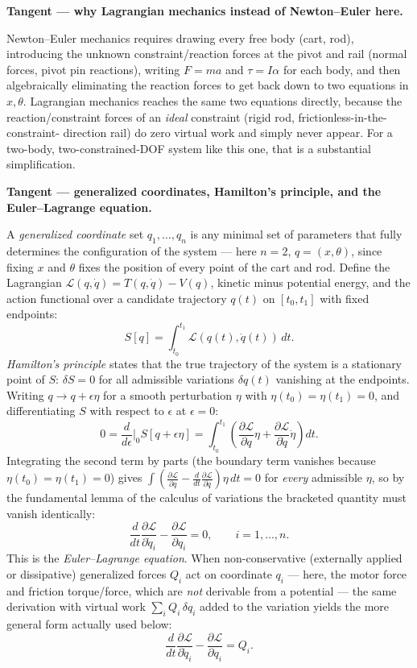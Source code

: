 \documentclass[11pt]{article}
\newenvironment{tangent}[1]{%
  \par\smallskip\noindent\hrulefill\par
  \noindent\textbf{Tangent — #1.}\par\smallskip
  \begingroup\itshape
}{%
  \endgroup
  \par\noindent\hrulefill\par\smallskip
}
\begin{document}
\begin{tangent}{why Lagrangian mechanics instead of Newton--Euler here}
Newton--Euler mechanics requires drawing every free body (cart, rod),
introducing the unknown constraint/reaction forces at the pivot and rail
(normal forces, pivot pin reactions), writing $F=ma$ and $\tau = I\alpha$
for each body, and then algebraically eliminating the reaction forces to
get back down to two equations in $x,\theta$. Lagrangian mechanics reaches
the same two equations directly, because the reaction/constraint forces of
an \emph{ideal} constraint (rigid rod, frictionless-in-the-constraint-
direction rail) do zero virtual work and simply never appear. For a
two-body, two-constrained-DOF system like this one, that is a substantial
simplification.
\end{tangent}

\begin{tangent}{generalized coordinates, Hamilton's principle, and the
Euler--Lagrange equation}
A \emph{generalized coordinate} set $q_1,\dots,q_n$ is any minimal set of
parameters that fully determines the configuration of the system — here
$n=2$, $q = (x,\theta)$, since fixing $x$ and $\theta$ fixes the position
of every point of the cart and rod. Define the Lagrangian $\mathcal L(q,
\dot q) = T(q,\dot q) - V(q)$, kinetic minus potential energy, and the
action functional over a candidate trajectory $q(t)$ on $[t_0,t_1]$ with
fixed endpoints:
\[
  S[q] = \int_{t_0}^{t_1} \mathcal L(q(t),\dot q(t))\,dt.
\]
\emph{Hamilton's principle} states that the true trajectory of the system
is a stationary point of $S$: $\delta S = 0$ for all admissible variations
$\delta q(t)$ vanishing at the endpoints. Writing $q \to q+\epsilon\eta$
for a smooth perturbation $\eta$ with $\eta(t_0)=\eta(t_1)=0$, and
differentiating $S$ with respect to $\epsilon$ at $\epsilon=0$:
\[
  0 = \frac{d}{d\epsilon}\Big|_{0} S[q+\epsilon\eta]
    = \int_{t_0}^{t_1}\left(\frac{\partial \mathcal L}{\partial q}\eta
      + \frac{\partial \mathcal L}{\partial \dot q}\dot\eta\right) dt.
\]
Integrating the second term by parts (the boundary term vanishes because
$\eta(t_0)=\eta(t_1)=0$) gives
$\int \left(\frac{\partial \mathcal L}{\partial q} -
\frac{d}{dt}\frac{\partial \mathcal L}{\partial \dot q}\right)\eta\,dt = 0$
for \emph{every} admissible $\eta$, so by the fundamental lemma of the
calculus of variations the bracketed quantity must vanish identically:
\[
  \frac{d}{dt}\frac{\partial \mathcal L}{\partial \dot q_i}
  - \frac{\partial \mathcal L}{\partial q_i} = 0, \qquad i=1,\dots,n.
\]
This is the \emph{Euler--Lagrange equation}. When non-conservative
(externally applied or dissipative) generalized forces $Q_i$ act on
coordinate $q_i$ — here, the motor force and friction torque/force, which
are \emph{not} derivable from a potential — the same derivation with
virtual work $\sum_i Q_i\,\delta q_i$ added to the variation yields the
more general form actually used below:
\[
  \frac{d}{dt}\frac{\partial \mathcal L}{\partial \dot q_i}
  - \frac{\partial \mathcal L}{\partial q_i} = Q_i.
\]
\end{tangent}
\end{document}

